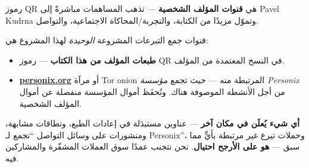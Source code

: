 \begin{minipage}[t]{0.60\textwidth}
\vspace{0pt}
\begin{mdframed}[
  linewidth=0.7pt,roundcorner=5pt,
  innerleftmargin=10pt,innerrightmargin=10pt,
  innertopmargin=8pt,innerbottommargin=8pt,
  skipabove=0pt,skipbelow=0pt,
  linecolor=cbwarning!50,backgroundcolor=cbwarning!5,
  nobreak=true,
  needspace=4\baselineskip,
]
\footnotesize
رموز QR هي \textbf{قنوات المؤلف الشخصية} --- تذهب المساهمات مباشرةً إلى Pavel Kudrna وتموّل مزيدًا من الكتابة، والتجربة/المحاكاة الاجتماعية، والتواصل.

\smallskip
قنوات جمع التبرعات المشروعة \emph{الوحيدة} لهذا المشروع هي:

\smallskip
\begin{itemize}
\setlength{\itemsep}{0pt}
\setlength{\topsep}{0pt}
\item \textbf{طبعات المؤلف من هذا الكتاب} --- رموز QR في النسخ المعتمدة من المؤلف.
\item \href{https://personix.org}{\textbf{personix.org}} أو مرآة Tor onion المرتبطة منه --- حيث تجمع \emph{مؤسسة Personix} من أجل الأنشطة الموصوفة هناك. وتُحفَظ أموال المؤسسة منفصلة عن أموال المؤلف الشخصية.
\end{itemize}

\smallskip
\textbf{أي شيء يُعلَن في مكان آخر} --- عناوين مستبدَلة في إعادات الطبع، ونطاقات مشابهة، ومنشورات على وسائل التواصل ``تجمع لـ Personix''، وحملات تبرع غير مرتبطة بأيٍّ مما سبق --- \textbf{هو على الأرجح احتيال}. نحن نتجنب عمدًا سوق العملات المشفّرة والمشاركين فيه.
\end{mdframed}
\end{minipage}

\clearpage
